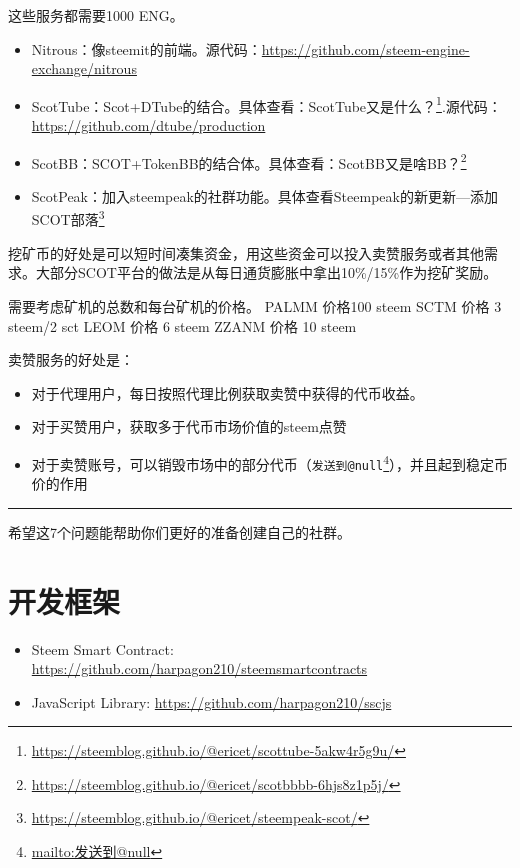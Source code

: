 \documentclass[]{ctexbook}
\providecommand{\tightlist}{%
  \setlength{\itemsep}{0pt}\setlength{\parskip}{0pt}}
\renewcommand{\href}[2]{#2\footnote{\url{#1}}}
\begin{document}
这些服务都需要1000 ENG。

\begin{itemize}
\tightlist
\item
  Nitrous：像steemit的前端。源代码：\url{https://github.com/steem-engine-exchange/nitrous}
\item
  ScotTube：Scot+DTube的结合。具体查看：\href{https://steemblog.github.io/@ericet/scottube-5akw4r5g9u/}{ScotTube又是什么？}.源代码：\url{https://github.com/dtube/production}
\item
  ScotBB：SCOT+TokenBB的结合体。具体查看：\href{https://steemblog.github.io/@ericet/scotbbbb-6hjs8z1p5j/}{ScotBB又是啥BB？}
\item
  ScotPeak：加入steempeak的社群功能。具体查看\href{https://steemblog.github.io/@ericet/steempeak-scot/}{Steempeak的新更新---添加SCOT部落}
\end{itemize}

挖矿币的好处是可以短时间凑集资金，用这些资金可以投入卖赞服务或者其他需求。大部分SCOT平台的做法是从每日通货膨胀中拿出10\%/15\%作为挖矿奖励。

需要考虑矿机的总数和每台矿机的价格。
PALMM 价格100 steem
SCTM 价格 3 steem/2 sct
LEOM 价格 6 steem
ZZANM 价格 10 steem

卖赞服务的好处是：

\begin{itemize}
\tightlist
\item
  对于代理用户，每日按照代理比例获取卖赞中获得的代币收益。
\item
  对于买赞用户，获取多于代币市场价值的steem点赞
\item
  对于卖赞账号，可以销毁市场中的部分代币（\href{mailto:发送到@null}{\nolinkurl{发送到@null}}），并且起到稳定币价的作用
\end{itemize}

\begin{center}\rule{0.5\linewidth}{\linethickness}\end{center}

希望这7个问题能帮助你们更好的准备创建自己的社群。

\hypertarget{frameworks}{%
\section{开发框架}\label{frameworks}}

\begin{itemize}
\tightlist
\item
  Steem Smart Contract: \url{https://github.com/harpagon210/steemsmartcontracts}
\item
  JavaScript Library: \url{https://github.com/harpagon210/sscjs}
\end{itemize}
\end{document}
